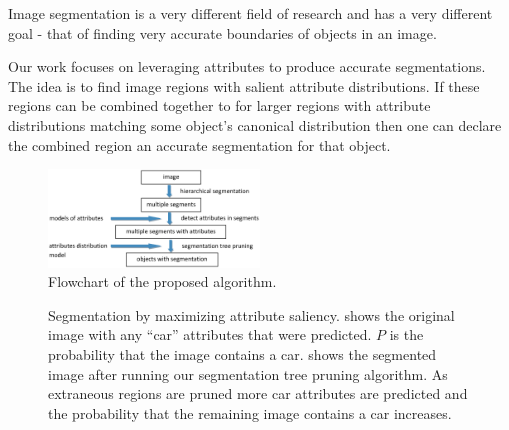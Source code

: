 \documentclass[10pt,twocolumn,letterpaper]{article}
\begin{document}
Image segmentation is a very different field of research and has a very different
goal - that of finding very accurate boundaries of objects in an image.

Our work focuses on leveraging attributes to produce accurate segmentations.
The idea is to find image regions with salient attribute distributions.  If
these regions can be combined together to for larger regions with attribute
distributions matching some object's canonical distribution then one can
declare the combined region an accurate segmentation for that object.

\begin{figure}
\centering
\includegraphics[width=0.5\textwidth]{figures/flowchart.eps}
\caption{Flowchart of the proposed algorithm.} \label{fig:flowchart}
\end{figure}


\begin{figure}
\centering
{}
\caption{Segmentation by maximizing attribute saliency.   shows
the original image with any ``car'' attributes that were predicted.  $P$ is the probability
that the image contains a car.   shows the segmented image after
running our segmentation tree pruning algorithm.  As extraneous regions are pruned
more car attributes are predicted and the probability that the remaining image
contains a car increases.}
\label{fig:truck}
\end{figure}
\end{document}
